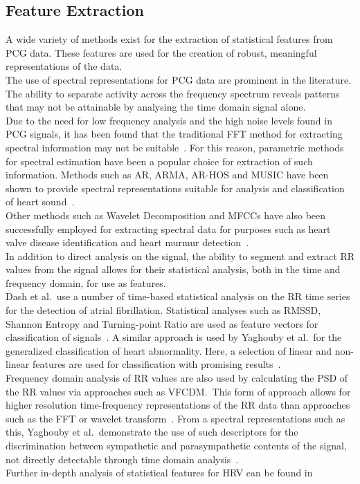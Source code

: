 \documentclass[titlepage, 12pt]{scrartcl} \usepackage{enumitem}
\begin{document}
\subsection{Feature Extraction}
A wide variety of methods exist for the extraction of statistical
features from PCG data. These features are used for the creation of
robust, meaningful representations of the data.\\
The use of spectral representations for PCG data are prominent in the
literature. The ability to separate activity across the frequency
spectrum reveals patterns that may not be attainable by analysing the
time domain signal alone.\\
Due to the need for low frequency analysis and the high noise levels
found in PCG signals, it has been found that the traditional FFT
method for extracting spectral information may not be
suitable~\parencite{Akay1990}. For this reason, parametric methods for
spectral estimation have been a popular choice for extraction of such information.
Methods such as AR, ARMA, AR-HOS and MUSIC have been shown to provide spectral
representations suitable for analysis and classification of heart
sound~\parencite{Ergen2001, Schmidt2015}.\\
Other methods such as Wavelet Decomposition and MFCCs have also been
successfully  employed for extracting spectral data for purposes such
as heart valve disease identification and heart murmur
detection~\parencite{Quiceno-Manrique2010a, Maglogiannis2009}.\\

In addition to direct analysis on the signal, the ability to segment
and extract RR values from the signal allows for their statistical
analysis, both in the time and frequency domain, for use as features.\\
Dash et al.\ use a number of time-based statistical analysis on the RR
time series for the detection of atrial fibrillation. Statistical
analyses such as RMSSD, Shannon Entropy and Turning-point Ratio are
used as feature vectors for classification of
signals~\citeyearpar{Dash2009}.  A similar approach is used by Yaghouby
et al.\ for the generalized classification of heart abnormality. Here,
a selection of linear and non-linear features are used for
classification with promising results~\citeyearpar{Yaghouby2009}.\\
Frequency domain analysis of RR values are also used by calculating the
PSD of the RR values via  approaches such as VFCDM.\ This form of
approach allows for higher resolution time-frequency representations of
the RR data than approaches such as the FFT or wavelet transform~\parencite{Wang2006}.
From a spectral representations such as this, Yaghouby et al.\
demonstrate the use of such descriptors for the discrimination between
sympathetic and parasympathetic contents of the signal, not directly
detectable through time domain analysis~\citeyearpar{Yaghouby2009}.\\
Further in-depth analysis of statistical features for HRV can be found
in~\parencite{Electrophysiology1996}
\end{document}
